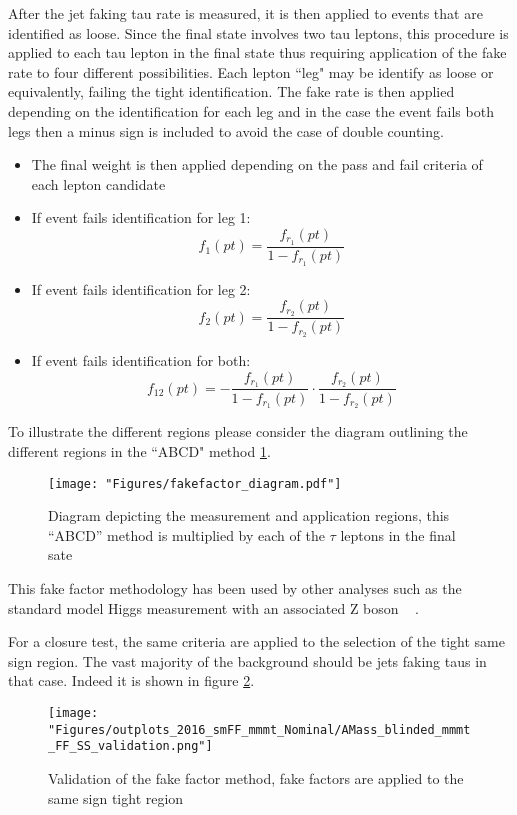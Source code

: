 After the jet faking tau rate is measured, it is then applied to events that are identified as loose. Since the final state involves two tau leptons, this procedure is applied to each tau lepton in the final state thus requiring application of the fake rate to four different possibilities. Each lepton ``leg" may be identify as loose or equivalently, failing the tight identification. The fake rate is then applied depending on the identification for each leg and in the case the event fails both legs then a minus sign is included to avoid the case of double counting. 
\begin{itemize}
\item{The final weight is then 
applied depending on the 
pass and fail criteria of each 
lepton candidate}
\item{If event fails identification for leg 1:\[f_1(pt)=\frac{f_{r_1}(pt)}{1-f_{r_1}(pt)}\]}
\item{If event fails identification for leg 2:\[f_2(pt)=\frac{f_{r_2}(pt)}{1-f_{r_2}(pt)}\]}
\item{If event fails identification for both:\[f_{12}(pt)=-\frac{f_{r_1}(pt)}{1-f_{r_1}(pt)}\cdot\frac{f_{r_2}(pt)}{1-f_{r_2}(pt)}\]}
\end{itemize}


To illustrate the different regions please consider the diagram outlining the different regions in the ``ABCD" method \ref{fig:fakefactor_reg}. 
\begin{figure}[ht!b]
  \texttt{[image: "Figures/fakefactor\_diagram.pdf"]}
    \caption{\label{fig:fakefactor_reg} Diagram depicting the measurement and application regions, this ``ABCD'' method is multiplied by each of the $\tau$ leptons in the final sate}
\end{figure}

This fake factor methodology has been used by other analyses such as the standard model Higgs measurement with an associated Z boson ~\cite{CMS-PAS-HIG-19-010} . 

For a closure test, the same criteria are applied to the selection of the tight same sign region. The vast majority of the background should be jets faking taus in that case. Indeed it is shown in figure \ref{fig:fakefactor_validation}.
  
\begin{figure}[ht!b]
  \texttt{[image: "Figures/outplots\_2016\_smFF\_mmmt\_Nominal/AMass\_blinded\_mmmt\_FF\_SS\_validation.png"]}
    \caption{\label{fig:fakefactor_validation} Validation of the fake factor method, fake factors are applied to the same sign tight region}
\end{figure}
